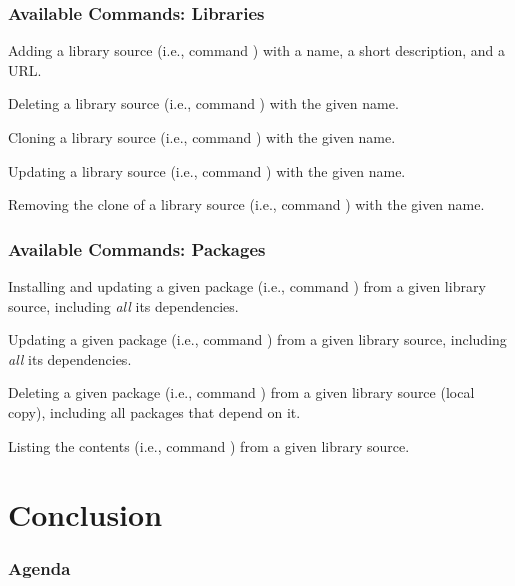 \documentclass[mathserif,fleqn]{beamer}
\begin{document}
\begin{frame}
  \frametitle{Available Commands: Libraries}
  
   \begin{outeritemize}
   \item Adding a library source (i.e., command ) with a
    name, a short description, and a  URL.
   \item Deleting a library source (i.e., command ) with
    the given name.
   \item Cloning a library source (i.e., command ) with the
    given name.
   \item Updating a library source (i.e., command ) with
    the given name.
   \item Removing the clone of a library source (i.e., command
    ) with the given name.
   \end{outeritemize}
  
\end{frame}

\begin{frame}
  \frametitle{Available Commands: Packages}
  
   \begin{outeritemize}
   \item Installing and updating a given package (i.e., command
    ) from a given library source, including {\em all} its
    dependencies.
  \item Updating a given package (i.e., command ) from a given
    library source, including {\em all} its dependencies.
  \item Deleting a given package (i.e., command ) from a given
    library source (local copy), including all packages that depend on
    it.
  \item Listing the contents (i.e., command ) from a given
    library source.
   \end{outeritemize}
  
\end{frame}

\section{Conclusion}

\begin{frame}
  \frametitle{Agenda} 
  \tableofcontents[currentsection]
\end{frame}
\end{document}

